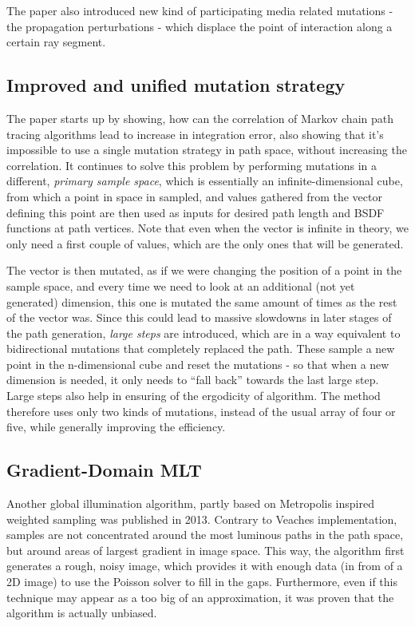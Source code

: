 The paper also introduced new kind of participating media related mutations - the propagation perturbations - which displace the point of interaction along a certain ray segment.

\subsection{Improved and unified mutation strategy}

The paper starts up by showing, how can the correlation of Markov chain path tracing algorithms lead to increase in integration error, also showing that it's impossible to use a single mutation strategy in path space, without increasing the correlation. It continues to solve this problem by performing mutations in a different, \emph{primary sample space}, which is essentially an infinite-dimensional cube, from which a point in space in sampled, and values gathered from the vector defining this point are then used as inputs for desired path length and BSDF functions at path vertices. Note that even when the vector is infinite in theory, we only need a first couple of values, which are the only ones that will be generated. 

The vector is then mutated, as if we were changing the position of a point in the sample space, and every time we need to look at an additional (not yet generated) dimension, this one is mutated the same amount of times as the rest of the vector was. Since this could lead to massive slowdowns in later stages of the path generation, \emph{large steps} are introduced, which are in a way equivalent to bidirectional mutations that completely replaced the path. These sample a new point in the n-dimensional cube and reset the mutations - so that when a new dimension is needed, it only needs to ``fall back'' towards the last large step. Large steps also help in ensuring of the ergodicity of algorithm. The method therefore uses only two kinds of mutations, instead of the usual array of four or five, while generally improving the efficiency.

\subsection{Gradient-Domain MLT}

Another global illumination algorithm, partly based on Metropolis inspired weighted sampling was published in 2013. Contrary to Veaches implementation, samples are not concentrated around the most luminous paths in the path space, but around areas of largest gradient in image space. This way, the algorithm first generates a rough, noisy image, which provides it with enough data (in from of a 2D image) to use the Poisson solver to fill in the gaps. Furthermore, even if this technique may appear as a too big of an approximation, it was proven that the algorithm is actually unbiased.